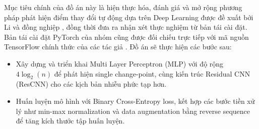 Mục tiêu chính của đồ án này là hiện thực hóa, đánh giá và mở rộng phương pháp phát hiện điểm thay đổi tự động
 dựa trên Deep Learning được đề xuất bởi Li và đồng nghiệp \cite{li2024automatic}, đồng thời đưa ra nhận xét thực nghiệm từ bản tái cài đặt.
 Bản tái cài đặt PyTorch của nhóm cũng được đối chiếu trực tiếp với mã 
 nguồn TensorFlow chính thức của các tác giả \cite{autocpd2024}. Đồ án sẽ thực hiện các bước sau:
\begin{itemize} 
    \item Xây dựng và triển khai Multi Layer Perceptron (MLP) với độ rộng $4\log_2(n)$ để phát hiện single change-point, 
    cùng kiến trúc Residual CNN (ResCNN) cho các kịch bản nhiễu phức tạp hơn. 
    \item Huấn luyện mô hình với Binary Cross-Entropy loss, kết hợp các bước tiền xử lý như min-max normalization 
    và data augmentation bằng reverse sequence để tăng kích thước tập huấn luyện. 
\end{itemize}
